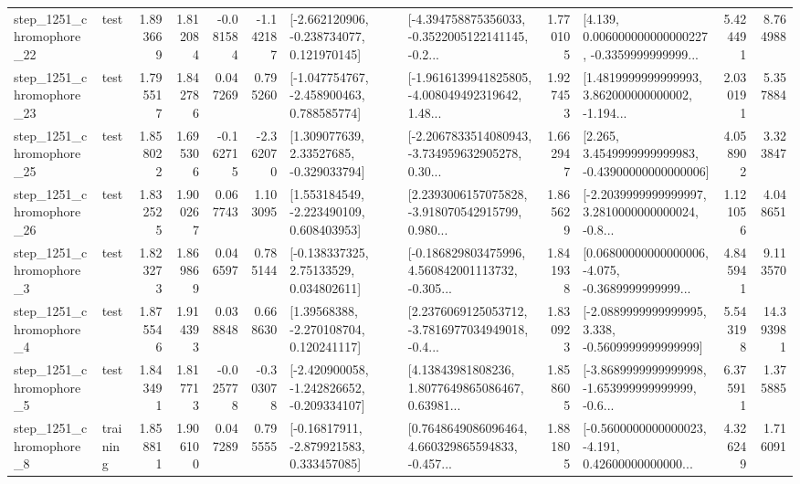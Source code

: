 \begin{tabular}{llrrrrllrlrr}
 step\_1251\_chromophore\_22 &      test &      1.893669 &    1.812084 &     -0.081584 & -1.142187 &   [-2.662120906, -0.238734077, 0.121970145] &  [-4.394758875356033, -0.3522005122141145, -0.2... &       1.770105 &  [4.139, 0.006000000000000227, -0.3359999999999... &            5.424491 &          8.764988 \\
 step\_1251\_chromophore\_23 &      test &      1.795517 &    1.842786 &      0.047269 &  0.795260 &   [-1.047754767, -2.458900463, 0.788585774] &  [-1.9616139941825805, -4.008049492319642, 1.48... &       1.927453 &  [1.4819999999999993, 3.862000000000002, -1.194... &            2.030191 &          5.357884 \\
 step\_1251\_chromophore\_25 &      test &      1.858022 &    1.695306 &     -0.162715 & -2.362070 &     [1.309077639, 2.33527685, -0.329033794] &  [-2.2067833514080943, -3.734959632905278, 0.30... &       1.662947 &  [2.265, 3.4549999999999983, -0.43900000000000006] &            4.058902 &          3.323847 \\
 step\_1251\_chromophore\_26 &      test &      1.832525 &    1.900267 &      0.067743 &  1.103095 &    [1.553184549, -2.223490109, 0.608403953] &  [2.2393006157075828, -3.918070542915799, 0.980... &       1.865629 &  [-2.2039999999999997, 3.2810000000000024, -0.8... &            1.121056 &          4.048651 \\
  step\_1251\_chromophore\_3 &      test &      1.823273 &    1.869869 &      0.046597 &  0.785144 &     [-0.138337325, 2.75133529, 0.034802611] &  [-0.186829803475996, 4.560842001113732, -0.305... &       1.841938 &  [0.06800000000000006, -4.075, -0.3689999999999... &            4.845941 &          9.113570 \\
  step\_1251\_chromophore\_4 &      test &      1.875546 &    1.914393 &      0.038848 &  0.668630 &     [1.39568388, -2.270108704, 0.120241117] &  [2.2376069125053712, -3.7816977034949018, -0.4... &       1.830923 &  [-2.0889999999999995, 3.338, -0.5609999999999999] &            5.543198 &         14.393981 \\
  step\_1251\_chromophore\_5 &      test &      1.843491 &    1.817713 &     -0.025778 & -0.303078 &  [-2.420900058, -1.242826652, -0.209334107] &  [4.13843981808236, 1.8077649865086467, 0.63981... &       1.858605 &  [-3.8689999999999998, -1.653999999999999, -0.6... &            6.375911 &          1.375885 \\
  step\_1251\_chromophore\_8 &  training &      1.858811 &    1.906100 &      0.047289 &  0.795555 &    [-0.16817911, -2.879921583, 0.333457085] &  [0.7648649086096464, 4.660329865594833, -0.457... &       1.881805 &  [-0.5600000000000023, -4.191, 0.42600000000000... &            4.326249 &          1.716091 \\

\end{tabular}
